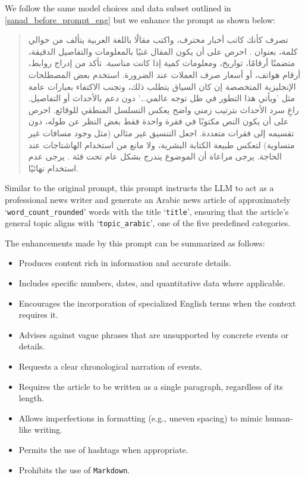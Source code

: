 We follow the same model choices and data subset outlined in \ref{sanad_before_prompt_eng} but we enhance the prompt as shown below:

\begin{quote}
    \small
    \begin{RLtext}
    تصرف كأنك كاتب أخبار محترف، واكتب مقالًا باللغة العربية يتألف من حوالي  كلمة، بعنوان . احرص على أن يكون المقال غنيًا بالمعلومات والتفاصيل الدقيقة، متضمنًا أرقامًا، تواريخ، ومعلومات كمية إذا كانت مناسبة. تأكد من إدراج روابط، أرقام هواتف، أو أسعار صرف العملات عند الضرورة. استخدم بعض المصطلحات الإنجليزية المتخصصة إن كان السياق يتطلب ذلك، وتجنب الاكتفاء بعبارات عامة مثل 'ويأتي هذا التطور في ظل توجه عالمي...' دون دعم بالأحداث أو التفاصيل. راعِ سرد الأحداث بترتيب زمني واضح يعكس التسلسل المنطقي للوقائع. احرص على أن يكون النص مكتوبًا في فقرة واحدة فقط بغض النظر عن طوله، دون تقسيمه إلى فقرات متعددة. اجعل التنسيق غير مثالي (مثل وجود مسافات غير متساوية) لتعكس طبيعة الكتابة البشرية، ولا مانع من استخدام الهاشتاجات عند الحاجة. يرجى مراعاة أن الموضوع يندرج بشكل عام تحت فئة . يرجى عدم استخدام  نهائيًا.
    \end{RLtext}
\end{quote}

Similar to the original prompt, this prompt instructs the LLM to act as a professional news writer and generate an Arabic news article of approximately `\texttt{word\_count\_rounded}' words with the title `\texttt{title}', ensuring that the article's general topic aligns with `\texttt{topic\_arabic}', one of the five predefined categories.

The enhancements made by this prompt can be summarized as follows:
\begin{itemize}
    \item Produces content rich in information and accurate details.
    \item Includes specific numbers, dates, and quantitative data where applicable.
    \item Encourages the incorporation of specialized English terms when the context requires it.
    \item Advises against vague phrases that are unsupported by concrete events or details.
    \item Requests a clear chronological narration of events.
    \item Requires the article to be written as a single paragraph, regardless of its length.
    \item Allows imperfections in formatting (e.g., uneven spacing) to mimic human-like writing.
    \item Permits the use of hashtags when appropriate.
    \item Prohibits the use of \texttt{Markdown}.
\end{itemize}

